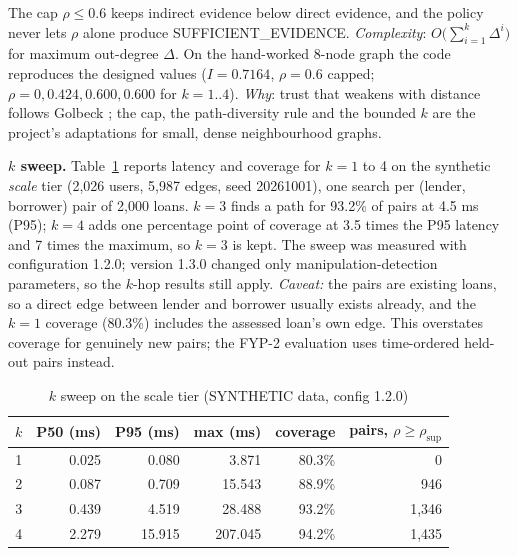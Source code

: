 The cap $\rho \leq 0.6$ keeps indirect evidence below direct evidence, and the policy never lets $\rho$ alone produce SUFFICIENT\_EVIDENCE. \textit{Complexity}: $O\bigl(\sum_{i=1}^{k} \Delta^{i}\bigr)$ for maximum out-degree $\Delta$. On the hand-worked 8-node graph the code reproduces the designed values ($I = 0.7164$, $\rho = 0.6$ capped; $\rho = 0, 0.424, 0.600, 0.600$ for $k = 1..4$). \textit{Why}: trust that weakens with distance follows Golbeck \cite{golbeck2005}; the cap, the path-diversity rule and the bounded $k$ are the project's adaptations for small, dense neighbourhood graphs.

\textbf{$k$ sweep.} Table~\ref{tab:sweep-scale-tier-synthetic} reports latency and coverage for $k = 1$ to 4 on the synthetic \textit{scale} tier (2,026 users, 5,987 edges, seed 20261001), one search per (lender, borrower) pair of 2,000 loans. $k = 3$ finds a path for 93.2\% of pairs at 4.5 ms (P95); $k = 4$ adds one percentage point of coverage at 3.5 times the P95 latency and 7 times the maximum, so $k = 3$ is kept. The sweep was measured with configuration 1.2.0; version 1.3.0 changed only manipulation-detection parameters, so the $k$-hop results still apply. \textit{Caveat:} the pairs are existing loans, so a direct edge between lender and borrower usually exists already, and the $k = 1$ coverage (80.3\%) includes the assessed loan's own edge. This overstates coverage for genuinely new pairs; the FYP-2 evaluation uses time-ordered held-out pairs instead.

\begin{table}[!htbp]
\centering
\caption{$k$ sweep on the scale tier (SYNTHETIC data, config 1.2.0)}\label{tab:sweep-scale-tier-synthetic}
\begin{tabular}{@{}crrrrr@{}}
\toprule
$k$ & P50 (ms) & P95 (ms) & max (ms) & coverage & pairs, $\rho \geq \rho_{\mathrm{sup}}$ \\
\midrule
1 & 0.025 & 0.080 & 3.871 & 80.3\% & 0 \\
2 & 0.087 & 0.709 & 15.543 & 88.9\% & 946 \\
3 & 0.439 & 4.519 & 28.488 & 93.2\% & 1,346 \\
4 & 2.279 & 15.915 & 207.045 & 94.2\% & 1,435 \\
\bottomrule
\end{tabular}
\par{}
\end{table}

